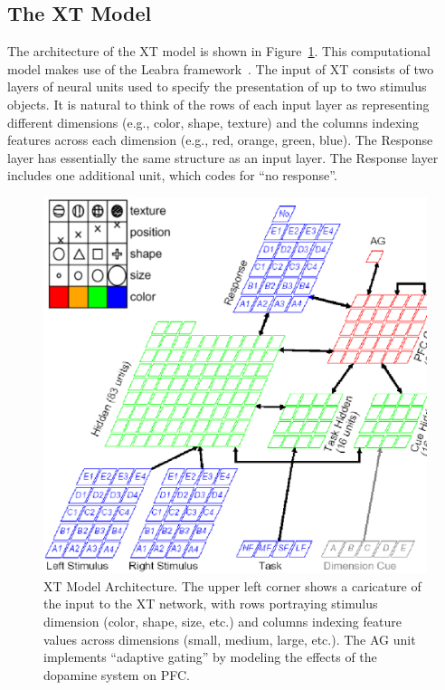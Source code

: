 \subsection{The XT Model} 


The architecture of the XT model is shown in Figure~\ref{xt-layout-figure}.  This computational model makes use of the Leabra framework~\cite{OReillyRC:2000:Computational}.  The input of XT consists of two layers of neural units used to specify the presentation of up to two stimulus objects.  It is natural to think of the rows of each input layer as representing different dimensions (e.g., color, shape, texture) and the columns indexing features across each dimension (e.g., red, orange, green, blue).  The Response layer has essentially the same structure as an input layer.  The Response layer includes one additional unit, which codes for ``no response''.  

\begin{figure}
\begin{center}
	\includegraphics[width=125mm]{figures/xt_arch_2.ps}
\end{center}
\caption{XT Model Architecture.  The upper left corner shows a
         caricature of the input to the XT network, with rows
         portraying stimulus dimension (color, shape, size, etc.) and
         columns indexing feature values across dimensions (small,
         medium, large, etc.).  The AG unit implements ``adaptive gating'' 
	 by modeling the effects of the dopamine system on PFC.}
\label{xt-layout-figure}
\end{figure} 

